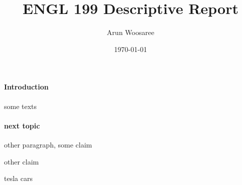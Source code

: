 \documentclass{article}
\title{ENGL 199 Descriptive Report}
\date{\today}
\author{Arun Woosaree}
\begin{document}
  \maketitle %

  \paragraph{Introduction}

  some texts
\cite{1}
  \paragraph{next topic}

  other paragraph, some claim \cite{WinNT}


  other claim\cite{website2013}

  tesla cars \cite{rosoff_elon_nodate}


  \newpage


\end{document}
